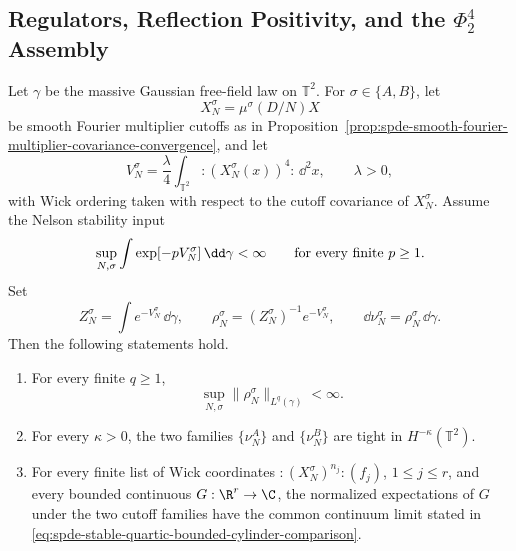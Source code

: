 \subsection{Regulators, Reflection Positivity, and the \texorpdfstring{\(\Phi^4_2\)}{Phi-four-two} Assembly}
\label{subsec:spde-dpd-regulators-os-assembly}

\begin{proposition}
\label{prop:spde-smooth-regulator-nelson-consequences}
Let \(\gamma\) be the massive Gaussian free-field law on
\(\mathbb T^2\).  For \(\sigma\in\{A,B\}\), let
\[
  X_N^\sigma=\mu^\sigma(D/N)X
\]
be smooth Fourier multiplier cutoffs as in
Proposition~\ref{prop:spde-smooth-fourier-multiplier-covariance-convergence},
and let
\[
  V_N^\sigma
  =
  \frac{\lambda}{4}\int_{\mathbb T^2}
  :\!(X_N^\sigma(x))^4\!:\,\dd^2x,
  \qquad \lambda>0,
\]
with Wick ordering taken with respect to the cutoff covariance of
\(X_N^\sigma\).  Assume the Nelson stability input
\begin{equation}
  \sup_{N,\sigma}
  \int \exp[-pV_N^\sigma]\,\dd\gamma<\infty
  \qquad\hbox{for every finite }p\geq1 .
  \label{eq:spde-smooth-regulator-nelson-input}
\end{equation}
Set
\[
  Z_N^\sigma=\int e^{-V_N^\sigma}\,\dd\gamma,
  \qquad
  \rho_N^\sigma=(Z_N^\sigma)^{-1}e^{-V_N^\sigma},
  \qquad
  \dd\nu_N^\sigma=\rho_N^\sigma\,\dd\gamma .
\]
Then the following statements hold.
\begin{enumerate}
\item For every finite \(q\geq1\),
\begin{equation}
  \sup_{N,\sigma}
  \|\rho_N^\sigma\|_{L^q(\gamma)}<\infty .
  \label{eq:spde-smooth-regulator-density-lq}
\end{equation}
\item For every \(\kappa>0\), the two families
\(\{\nu_N^A\}\) and \(\{\nu_N^B\}\) are tight in
\(H^{-\kappa}(\mathbb T^2)\).
\item For every finite list of Wick coordinates
\(:\!(X_N^\sigma)^{n_j}\!:(f_j)\), \(1\leq j\leq r\), and every bounded
continuous \(G:\R^r\to\C\), the normalized expectations of
\(G\) under the two cutoff families have the common continuum limit stated in
\eqref{eq:spde-stable-quartic-bounded-cylinder-comparison}.
\end{enumerate}
\end{proposition}

